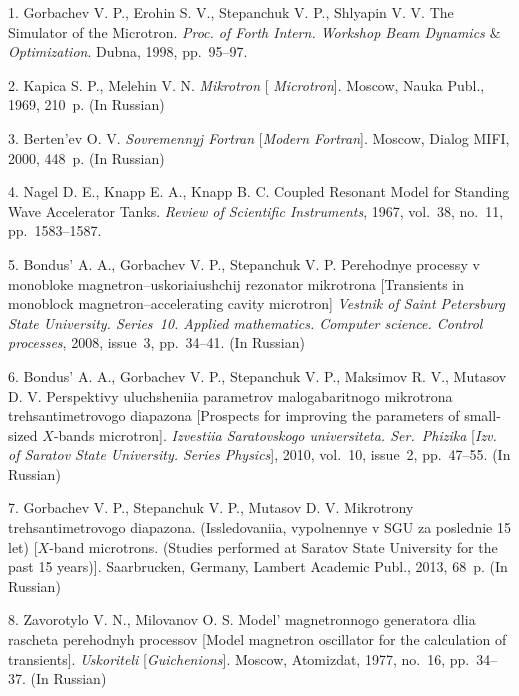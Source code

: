 

{\footnotesize

\vskip 2mm


\vskip 1.5mm




{1.} Gorbachev V. P., Erohin S. V., Stepanchuk V. P., Shlyapin V.
V. The Simulator of the Microtron. {\it Proc. of  Forth   Intern.
Workshop Beam Dynamics $\&$ Optimization}.  Dubna, 1998,
pp.~95--97.

{2.} Kapica S. P., Melehin V. N. {\it Mikrotron} [{\it
Microtron}]. Moscow, Nauka Publ., 1969, 210~p. (In Russian)

{3.} Berten'ev O. V. {\it Sovremennyj Fortran} [{\it Modern
Fortran}]. Moscow, Dialog MIFI, 2000, 448~p. (In Russian)

{4.} Nagel D. E., Knapp E. A., Knapp B. C. Coupled Resonant Model
for Standing Wave Accelerator Tanks. {\it Review of  Scientific
Instruments}, 1967, vol.~38, no.~11, pp.~1583--1587.

{5.} Bondus' A. A., Gorbachev V. P., Stepanchuk V. P. Perehodnye
processy v monobloke magnetron--uskoriaiushchij rezonator
mikrotrona   [Transients in monoblock magnetron--accelerating
cavity microtron] {\it Vestnik of Saint Petersburg State
University. Series~10. Applied mathematics. Computer science.
Control processes}, 2008, issue~3, pp.~34--41. (In Russian)

{6.} Bondus' A. A., Gorbachev V. P.,   Stepanchuk V. P., Maksimov
R. V., Mutasov D. V. Perspektivy uluchsheniia parametrov
malogabaritnogo mikrotrona trehsantimetrovogo diapazona [Prospects
for improving the parameters of small-sized $X$-bands microtron].
{\it Izvestiia Saratovskogo universiteta. Ser.~Phizika} [{\it Izv.
of Saratov State University. Series Physics}], 2010, vol.~10,
issue~2, pp.~47--55. (In Russian)

{7.} Gorbachev V. P.,  Stepanchuk V. P., Mutasov D. V. Mikrotrony
trehsantimetrovogo diapazona. (Issledovaniia, vypolnennye v SGU za
poslednie 15 let) [$X$-band microtrons. (Studies performed at
Saratov State University for the past 15 years)]. Saarbrucken,
Germany,  Lambert Academic Publ., 2013, 68~p. (In Russian)

{8.} Zavorotylo V. N., Milovanov O. S. Model' magnetronnogo
generatora dlia rascheta perehodnyh processov [Model magnetron
oscillator for the calculation of transients]. {\it Uskoriteli}
[{\it Guichenions}]. Moscow, Atomizdat, 1977, no.~16, pp.~34--37.
(In Russian)

}
